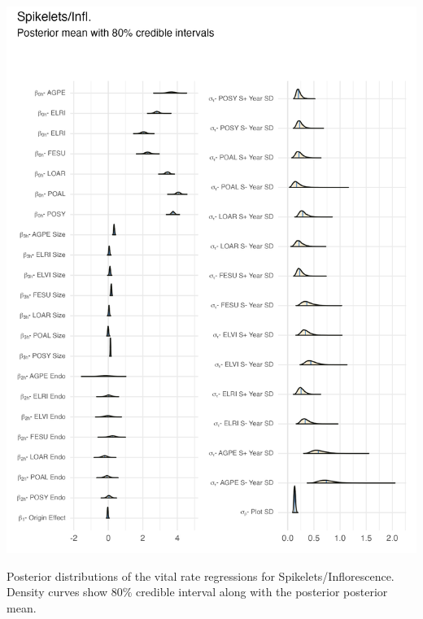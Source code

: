\documentclass[lineno, sn-basic]{sn-jnl}%
\providecommand{\DIFaddbegin}{} %
\providecommand{\DIFaddend}{} %
\providecommand{\DIFdelbegin}{} %
\providecommand{\DIFdelend}{} %
\providecommand{\DIFaddbeginFL}{} %
\providecommand{\DIFaddendFL}{} %
\providecommand{\DIFdelbeginFL}{} %
\providecommand{\DIFdelendFL}{} %
\newcommand{\DIFscaledelfig}{0.5}
\newlength{\DIFdelgraphicswidth} %
\newlength{\DIFdelgraphicsheight} %
\newcommand{\DIFaddincludegraphics}[2][]{{\color{blue}\fbox{\DIFOincludegraphics[#1]{#2}}}} %
\newcommand{\DIFdelincludegraphics}[2][]{%
\sbox{\DIFdelgraphicsbox}{\DIFOincludegraphics[#1]{#2}}%
\settoboxwidth{\DIFdelgraphicswidth}{\DIFdelgraphicsbox} %
\settoboxtotalheight{\DIFdelgraphicsheight}{\DIFdelgraphicsbox} %
\scalebox{\DIFscaledelfig}{%
\parbox[b]{\DIFdelgraphicswidth}{\usebox{\DIFdelgraphicsbox}\\[-\baselineskip] \rule{\DIFdelgraphicswidth}{0em}}\llap{\resizebox{\DIFdelgraphicswidth}{\DIFdelgraphicsheight}{%
\setlength{\unitlength}{\DIFdelgraphicswidth}%
\begin{picture}(1,1)%
\thicklines\linethickness{2pt} %
{\color[rgb]{1,0,0}\put(0,0){\framebox(1,1){}}}%
{\color[rgb]{1,0,0}\put(0,0){\line( 1,1){1}}}%
{\color[rgb]{1,0,0}\put(0,1){\line(1,-1){1}}}%
\end{picture}%
}\hspace*{3pt}}} %
} %
\DeclareRobustCommand{\DIFaddbegin}{\DIFOaddbegin \let\includegraphics\DIFaddincludegraphics} %
\DeclareRobustCommand{\DIFaddend}{\DIFOaddend \let\includegraphics\DIFOincludegraphics} %
\DeclareRobustCommand{\DIFdelbegin}{\DIFOdelbegin \let\includegraphics\DIFdelincludegraphics} %
\DeclareRobustCommand{\DIFdelend}{\DIFOaddend \let\includegraphics\DIFOincludegraphics} %
\DeclareRobustCommand{\DIFaddbeginFL}{\DIFOaddbeginFL \let\includegraphics\DIFaddincludegraphics} %
\DeclareRobustCommand{\DIFaddendFL}{\DIFOaddendFL \let\includegraphics\DIFOincludegraphics} %
\DeclareRobustCommand{\DIFdelbeginFL}{\DIFOdelbeginFL \let\includegraphics\DIFdelincludegraphics} %
\DeclareRobustCommand{\DIFdelendFL}{\DIFOaddendFL \let\includegraphics\DIFOincludegraphics} %
\begin{document}
\DIFdelbegin %
\DIFdelendFL \DIFaddbeginFL \begin{myfigure}[H]
	\DIFaddendFL \centering
	\includegraphics[width = \linewidth]{spike_posteriors_plot.png}
	\DIFdelbeginFL %
\DIFdelendFL \DIFaddbeginFL \caption[Posterior distributions of the vital rate regressions for Spikelets/Inflorescence]{\DIFaddendFL Posterior distributions of the vital rate regressions for Spikelets/Inflorescence. Density curves show $80\%$ credible interval along with the posterior posterior mean.}
\DIFdelbeginFL %
\DIFdelend \DIFaddbegin \end{myfigure}
\DIFaddend 
\end{document}
